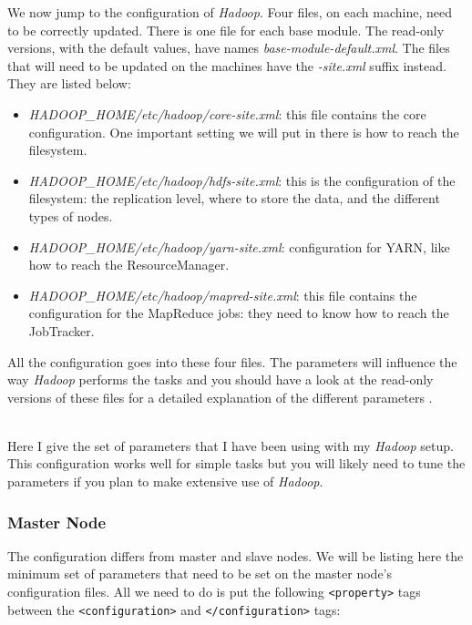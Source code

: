 \documentclass[a4paper, 12pt]{article}
\begin{document}
We now jump to the configuration of \textit{Hadoop}. Four files, on each machine, need to be correctly updated. There is one file for each base module. The read-only versions, with the default values, have names \textit{base-module-default.xml}. The files that will need to be updated on the machines have the \textit{-site.xml} suffix instead. They are listed below:
\begin{itemize}
  \item \textit{HADOOP\_HOME/etc/hadoop/core-site.xml}: this file contains the core configuration. One important setting we will put in there is how to reach the filesystem.
  \item \textit{HADOOP\_HOME/etc/hadoop/hdfs-site.xml}: this is the configuration of the filesystem: the replication level, where to store the data, and the different types of nodes.
  \item \textit{HADOOP\_HOME/etc/hadoop/yarn-site.xml}: configuration for YARN, like how to reach the ResourceManager.
  \item \textit{HADOOP\_HOME/etc/hadoop/mapred-site.xml}: this file contains the configuration for the MapReduce jobs: they need to know how to reach the JobTracker.
\end{itemize}

All the configuration goes into these four files. The parameters will influence the way \textit{Hadoop} performs the tasks and you should have a look at the read-only versions of these files for a detailed explanation of the different parameters \cite{hadoop_core_default} \cite{hadoop_hdfs_default} \cite{hadoop_yarn_default} \cite{hadoop_mapred_default}.

~\\
Here I give the set of parameters that I have been using with my \textit{Hadoop} setup. This configuration works well for simple tasks but you will likely need to tune the parameters if you plan to make extensive use of \textit{Hadoop}.

    \subsubsection{Master Node}

The configuration differs from master and slave nodes. We will be listing here the minimum set of parameters that need to be set on the master node's configuration files. All we need to do is put the following \texttt{<property>} tags between the \texttt{<configuration>} and \texttt{</configuration>} tags:
\end{document}
